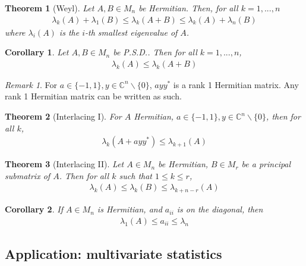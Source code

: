 \documentclass[11pt]{article}
\newcommand{\C}{\ensuremath{\mathbb C}}
\theoremstyle{plain}
\newtheorem{thm}{Theorem}[section]
\newtheorem{coro}{Corollary}[section]
\theoremstyle{definition}
\theoremstyle{remark}
\newtheorem{rem}{Remark}[section]
\begin{document}
\begin{thm}[Weyl]
    Let $A, B \in M_n$ be Hermitian. Then, for all $k = 1, ..., n$
    \begin{align*}
        \lambda_k(A) + \lambda_1(B) \leq \lambda_k(A + B) \leq \lambda_k(A) + \lambda_n(B)
    \end{align*}
    where $\lambda_i(A)$ is the $i$-th smallest eigenvalue of $A$.
\end{thm}

\begin{coro}
    Let $A, B \in M_n$ be P.S.D.. Then for all $k = 1, ..., n$,
    \begin{align*}
        \lambda_k(A) \leq \lambda_k(A + B)
    \end{align*}
\end{coro}

\begin{rem}
    For $a \in \{-1, 1\}, y \in \C^n \backslash \{0\}$, $ayy^*$ is a rank 1 Hermitian matrix. Any rank 1 Hermitian matrix can be written as such.
\end{rem}
\begin{thm}[Interlacing I]
    For $A$ Hermitian, $a \in \{-1, 1\}, y \in \C^n \backslash \{0\}$, then for all $k$,
    \begin{align*}
        \lambda_k(A + ayy^*) \leq \lambda_{k+1}(A) 
    \end{align*}
\end{thm}

\begin{thm}[Interlacing II]
    Let $A \in M_n$ be Hermitian, $B \in M_r$ be a principal submatrix of $A$. Then for all $k$ such that $1 \leq k \leq r$,
    \begin{align*}
        \lambda_k(A) \leq \lambda_k(B) \leq \lambda_{k+n-r}(A)
    \end{align*}
\end{thm}

\begin{coro}
    If $A \in M_n$ is Hermitian, and $a_{ii}$ is on the diagonal, then
    \begin{align*}
        \lambda_1(A) \leq a_{ii} \leq \lambda_n
    \end{align*}
\end{coro}

\subsection*{Application: multivariate statistics}
\end{document}
